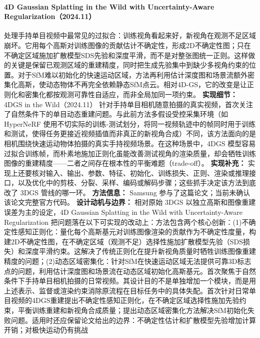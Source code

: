 \paragraph{4D Gaussian Splatting in the Wild with Uncertainty-Aware Regularization（2024.11）\cite{2411_08879}}
处理手持单目视频中最常见的过拟合：训练视角看起来好，新视角在观测不足区域崩坏。它用每个高斯对训练图像的贡献估计不确定性，形成2D不确定性图；只在不确定区域施加扩散模型SDS先验和深度平滑，而不是对整张图统一正则。这样做的关键是保留已观测区域的重建精度，同时把生成先验集中到缺少多视角约束的位置。对于SfM难以初始化的快速运动区域，方法再利用估计深度图和场景流额外密集化高斯，使动态物体不再完全依赖静态SfM点云。相对4D-GS，它的改变是让正则化和密集化都按观测可靠性自适应，而非全局加同一项约束。
\textbf{实现细节：} 4DGS in the Wild（2024.11） 针对手持单目相机随意拍摄的真实视频，首次关注了自然条件下的单目动态重建问题。与此前方法多假设受控采集环境（如 HyperNeRF 使用不切实际的训练-测试划分，将同一视频轨迹中的帧同时用于训练和测试，使得任务更接近视频插值而非真正的新视角合成）不同，该方法面向的是相机围绕快速运动物体拍摄的真实手持视频场景。在这种场景中，4DGS 模型容易过拟合训练帧，而朴素地施加正则化虽能改善测试视角的渲染质量，却会牺牲训练图像的重建精度——二者之间存在根本性的平衡难题（trade-off）。
\textbf{实现补充：} 实现上还要核对输入、输出、参数、特征、初始化、训练损失、正则、渲染或推理接口，以及优化中的剪枝、分裂、采样、编码或解码步骤；这些抓手决定该方法到底改了 3DGS 管线的哪一环。
\textbf{方法信息：} Samsung 参与了这篇论文；当前未确认该论文完整官方代码。
\textbf{设计动机与边界：} 相对原始 3DGS 以独立高斯和图像重建误差为主的设定，4D Gaussian Splatting in the Wild with Uncertainty-Aware Regularization 把问题落在以下可实现的改动上：方法包含两个核心创新：(1)不确定性感知正则化：量化每个高斯基元对训练图像渲染的贡献作为不确定性度量，构建2D不确定性图，在不确定区域（观测不足）选择性施加扩散模型先验（SDS损失）和深度平滑约束。这解决了传统正则化在提升新视角质量时牺牲训练图像重建精度的问题；(2)动态区域密集化：针对SfM在快速运动区域无法提供可靠3D标志点的问题，利用估计深度图和场景流在动态区域初始化高斯基元。首次聚焦于自然条件下手持单目相机拍摄的日常视频。其设计目的不是单独增加一个模块，而是用上述表示、监督或渲染约束消除原流程在目标任务中的具体失配。首次针对日常单目视频的4DGS重建提出不确定性感知正则化，在不确定区域选择性施加先验约束，平衡训练重建和新视角合成质量；提出动态区域密集化方法解决SfM初始化失败问题。适用时还应保留论文给出的边界：不确定性估计和扩散模型先验增加计算开销；对极快运动仍有挑战
